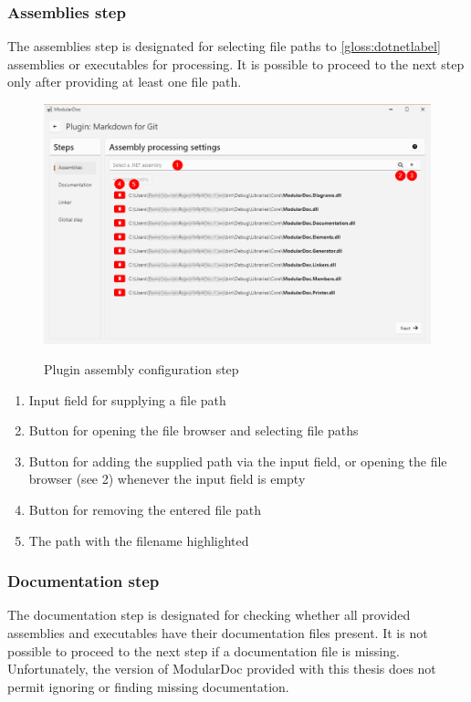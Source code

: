 \subsubsection{Assemblies step}

The assemblies step is designated for selecting file paths to \ref{gloss:dotnetlabel} assemblies or executables for processing. It is possible to proceed to the next step only after providing at least one file path.

\begin{figure}[H]
    \includegraphics[width=\linewidth]{img/modularDocAssemblies.png}
    \label{fig:modularAssemblies}
    \caption{Plugin assembly configuration step}
\end{figure}

\begin{enumerate}
    \item Input field for supplying a file path
    \item Button for opening the file browser and selecting file paths
    \item Button for adding the supplied path via the input field, or opening the file browser (see 2) whenever the input field is empty
    \item Button for removing the entered file path
    \item The path with the filename highlighted
\end{enumerate}

\pagebreak
\subsubsection{Documentation step}

The documentation step is designated for checking whether all provided assemblies and executables have their documentation files present. It is not possible to proceed to the next step if a documentation file is missing. Unfortunately, the version of ModularDoc provided with this thesis does not permit ignoring or finding missing documentation.

